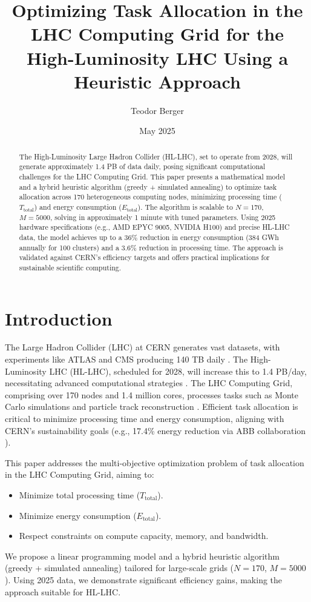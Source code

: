 \documentclass[a4paper,11pt]{article}
\title{Optimizing Task Allocation in the LHC Computing Grid for the High-Luminosity LHC Using a Heuristic Approach}
\author{Teodor Berger}
\date{May 2025}
\begin{document}
\maketitle

\begin{abstract}
The High-Luminosity Large Hadron Collider (HL-LHC), set to operate from 2028, will generate approximately 1.4 PB of data daily, posing significant computational challenges for the LHC Computing Grid. This paper presents a mathematical model and a hybrid heuristic algorithm (greedy + simulated annealing) to optimize task allocation across 170 heterogeneous computing nodes, minimizing processing time ($T_{\text{total}}$) and energy consumption ($E_{\text{total}}$). The algorithm is scalable to $N=170$, $M=5000$, solving in approximately 1 minute with tuned parameters. Using 2025 hardware specifications (e.g., AMD EPYC 9005, NVIDIA H100) and precise HL-LHC data, the model achieves up to a 36\% reduction in energy consumption (384 GWh annually for 100 clusters) and a 3.6\% reduction in processing time. The approach is validated against CERN's efficiency targets and offers practical implications for sustainable scientific computing.
\end{abstract}

\section{Introduction}
The Large Hadron Collider (LHC) at CERN generates vast datasets, with experiments like ATLAS and CMS producing 140 TB daily \cite{CERN2025}. The High-Luminosity LHC (HL-LHC), scheduled for 2028, will increase this to 1.4 PB/day, necessitating advanced computational strategies \cite{HL-LHC2025}. The LHC Computing Grid, comprising over 170 nodes and 1.4 million cores, processes tasks such as Monte Carlo simulations and particle track reconstruction \cite{LHCGrid2025}. Efficient task allocation is critical to minimize processing time and energy consumption, aligning with CERN's sustainability goals (e.g., 17.4\% energy reduction via ABB collaboration \cite{CERNABB2025}).

This paper addresses the multi-objective optimization problem of task allocation in the LHC Computing Grid, aiming to:
\begin{itemize}
    \item Minimize total processing time ($T_{\text{total}}$).
    \item Minimize energy consumption ($E_{\text{total}}$).
    \item Respect constraints on compute capacity, memory, and bandwidth.
\end{itemize}
We propose a linear programming model and a hybrid heuristic algorithm (greedy + simulated annealing) tailored for large-scale grids ($N=170$, $M=5000$). Using 2025 data, we demonstrate significant efficiency gains, making the approach suitable for HL-LHC.
\end{document}
